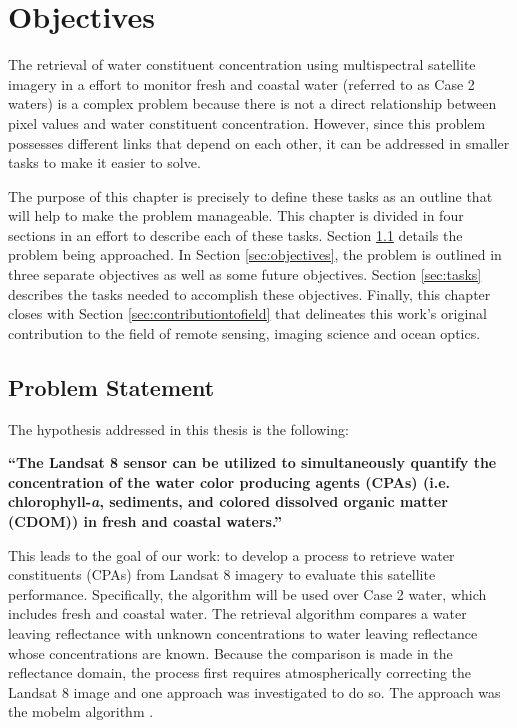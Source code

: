 \chapter{Objectives}
\label{ch:objectives}
\vspace{-0.5cm}

The retrieval of water constituent concentration using multispectral satellite imagery in a effort to monitor fresh and coastal water (referred to as Case 2 waters) is a complex problem because there is not a direct relationship between pixel values and water constituent concentration. However, since this problem possesses different links that depend on each other, it can be addressed in smaller tasks to make it easier to solve. 

The purpose of this chapter is precisely to define these tasks as an outline that will help to make the problem manageable. This chapter is divided in four sections in an effort to describe each of these tasks. Section \ref{sec:problemstatement} details the problem being approached. In Section \ref{sec:objectives}, the problem is outlined in three separate objectives as well as some future objectives. Section \ref{sec:tasks} describes the tasks needed to accomplish these objectives. Finally, this chapter closes with Section \ref{sec:contributiontofield} that delineates this work's original contribution to the field of remote sensing, imaging science and ocean optics. 
\section{Problem Statement}
\label{sec:problemstatement}
The hypothesis addressed in this thesis is the following: 

{ \bf ``The Landsat 8 sensor can be utilized to simultaneously quantify the concentration of the water color producing agents (CPAs) (i.e. chlorophyll-{\it a}, sediments, and colored dissolved organic matter (CDOM)) in fresh and coastal waters.''} 

This leads to the goal of our work: to develop a process to retrieve water constituents (CPAs) from Landsat 8 imagery to evaluate this satellite performance. Specifically, the algorithm will be used over Case 2 water, which includes fresh and coastal water. The retrieval algorithm compares a water leaving reflectance with unknown concentrations to water leaving reflectance whose concentrations are known. Because the comparison is made in the reflectance domain, the process first requires atmospherically correcting the Landsat 8 image and one approach was investigated to do so. The approach was the \acrfull{mobelm} algorithm \cite{Concha2014SPIE}.


